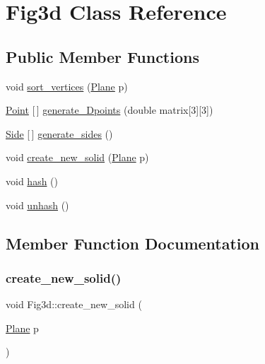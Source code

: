 \hypertarget{class_fig3d}{}\section{Fig3d Class Reference}
\label{class_fig3d}
\subsection*{Public Member Functions}
\begin{DoxyCompactItemize}
\item 
void \mbox{\hyperlink{class_fig3d_acea85aac6739bd0824921deede69590e}{sort\+\_\+vertices}} (\mbox{\hyperlink{class_plane}{Plane}} p)
\item 
\mbox{\hyperlink{class_point}{Point}} \mbox{[}$\,$\mbox{]} \mbox{\hyperlink{class_fig3d_a44d92006b733d19d899496657bca9729}{generate\+\_\+Dpoints}} (double matrix\mbox{[}3\mbox{]}\mbox{[}3\mbox{]})
\item 
\mbox{\hyperlink{class_side}{Side}} \mbox{[}$\,$\mbox{]} \mbox{\hyperlink{class_fig3d_afef51436c82aae83ce95314e3ca36e06}{generate\+\_\+sides}} ()
\item 
void \mbox{\hyperlink{class_fig3d_aac9c6733233e2f8c21a50a4c30a2ed20}{create\+\_\+new\+\_\+solid}} (\mbox{\hyperlink{class_plane}{Plane}} p)
\item 
void \mbox{\hyperlink{class_fig3d_ac8c3a1dc754f382f22ec2dac6dc16f4f}{hash}} ()
\item 
void \mbox{\hyperlink{class_fig3d_aa9265eb5e3c5ba3e57f303005e53d060}{unhash}} ()
\end{DoxyCompactItemize}


\subsection{Member Function Documentation}
\mbox{\label{class_fig3d_aac9c6733233e2f8c21a50a4c30a2ed20}} 
\subsubsection{\texorpdfstring{create\+\_\+new\+\_\+solid()}{create\_new\_solid()}}
{\footnotesize\ttfamily void Fig3d\+::create\+\_\+new\+\_\+solid (\begin{DoxyParamCaption}\item[{\mbox{\hyperlink{class_plane}{Plane}}}]{p }\end{DoxyParamCaption})}

